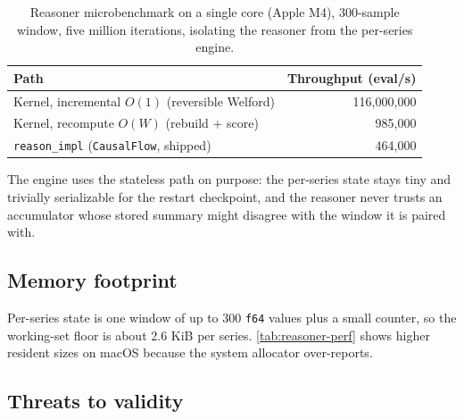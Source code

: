 \begin{table}[t]
  \centering
  \caption{Reasoner microbenchmark on a single core (Apple M4), $300$-sample
  window, five million iterations, isolating the reasoner from the per-series
  engine.}
  \label{tab:reasoner-decomp}
  \begin{tabular}{lr}
    \toprule
    Path & Throughput (eval/s) \\
    \midrule
    Kernel, incremental $O(1)$ (reversible Welford)      & 116{,}000{,}000 \\
    Kernel, recompute $O(W)$ (rebuild + score)           & 985{,}000 \\
    \texttt{reason\_impl} (\texttt{CausalFlow}, shipped) & 464{,}000 \\
    \bottomrule
  \end{tabular}
\end{table}

The engine uses the stateless path on purpose: the per-series state stays tiny and
trivially serializable for the restart checkpoint, and the reasoner never trusts an
accumulator whose stored summary might disagree with the window it is paired with.

\subsection{Memory footprint}
Per-series state is one window of up to 300 \texttt{f64} values plus a small
counter, so the working-set floor is about 2.6 KiB per series. \cref{tab:reasoner-perf}
shows higher resident sizes on macOS because the system allocator over-reports.
 

\subsection{Threats to validity}
 \TODO{}

